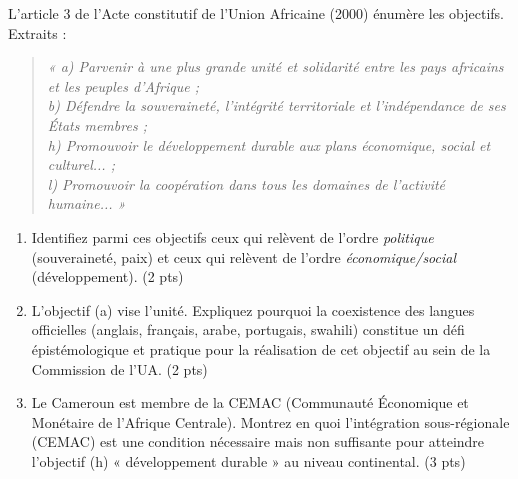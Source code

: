 \documentclass[11pt]{article}
\begin{document}
\begin{exercice}
    L'article 3 de l'Acte constitutif de l'Union Africaine (2000) énumère les objectifs. Extraits :
    \begin{quote}
    \textit{« a) Parvenir à une plus grande unité et solidarité entre les pays africains et les peuples d'Afrique ; \\
    b) Défendre la souveraineté, l'intégrité territoriale et l'indépendance de ses États membres ; \\
    h) Promouvoir le développement durable aux plans économique, social et culturel... ; \\
    l) Promouvoir la coopération dans tous les domaines de l'activité humaine... »}
    \end{quote}

    \begin{enumerate}
        \item Identifiez parmi ces objectifs ceux qui relèvent de l'ordre \textit{politique} (souveraineté, paix) et ceux qui relèvent de l'ordre \textit{économique/social} (développement). (2 pts)
        \item L'objectif (a) vise l'unité. Expliquez pourquoi la coexistence des langues officielles (anglais, français, arabe, portugais, swahili) constitue un défi épistémologique et pratique pour la réalisation de cet objectif au sein de la Commission de l'UA. (2 pts)
        \item Le Cameroun est membre de la CEMAC (Communauté Économique et Monétaire de l'Afrique Centrale). Montrez en quoi l'intégration sous-régionale (CEMAC) est une condition nécessaire mais non suffisante pour atteindre l'objectif (h) « développement durable » au niveau continental. (3 pts)
    \end{enumerate}
\end{exercice}
\end{document}
